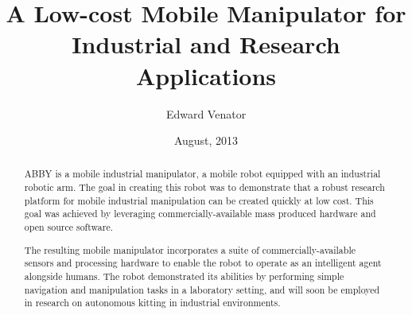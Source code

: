 \documentclass[]{cwru} %
\title{A Low-cost Mobile Manipulator for Industrial and Research Applications}
\author{Edward Venator}
\date{August, 2013} %
\begin{document}



% 

\maketitle
\makeapprovalsheet

\frontmatter
\tableofcontents

\cleardoublepage
{}
{}
\listoftables

\cleardoublepage
{}
{}
\listoffigures

\begin{acknowledgments}
\lipsum[1-3]
\end{acknowledgments}




\begin{abstract}
ABBY is a mobile industrial manipulator, a mobile robot equipped with an
industrial robotic arm. The goal in creating this robot was to
demonstrate that a robust research platform for mobile industrial
manipulation can be created quickly at low cost. This goal was achieved
by leveraging commercially-available mass produced hardware and open
source software.

The resulting mobile manipulator incorporates a suite of
commercially-available sensors and processing hardware to enable the
robot to operate as an intelligent agent alongside humans. The robot
demonstrated its abilities by performing simple navigation and
manipulation tasks in a laboratory setting, and will soon be employed in
research on autonomous kitting in industrial environments.
\end{abstract}
\end{document}
